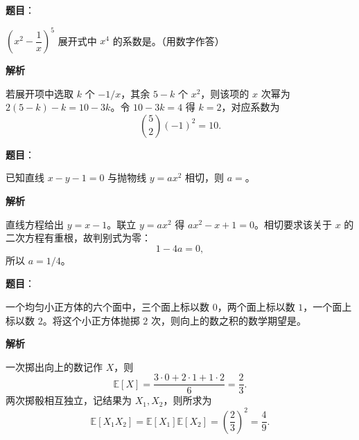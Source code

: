 \begin{answer}

\textbf{题目}：

$\left(x^2-\dfrac{1}{x}\right)^5$ 展开式中 $x^4$ 的系数是\gkblank{}。（用数字作答）

\textbf{解析}

若展开项中选取 $k$ 个 $-1/x$，其余 $5-k$ 个 $x^2$，则该项的 $x$ 次幂为 $2(5-k)-k=10-3k$。令 $10-3k=4$ 得 $k=2$，对应系数为
\nopagebreak[4]
\[
\binom52(-1)^2=10.
\]


\end{answer}
\begin{answer}

\textbf{题目}：

已知直线 $x-y-1=0$ 与抛物线 $y=ax^2$ 相切，则 $a=$\gkblank{}。

\textbf{解析}

直线方程给出 $y=x-1$。联立 $y=ax^2$ 得 $ax^2-x+1=0$。相切要求该关于 $x$ 的二次方程有重根，故判别式为零：
\nopagebreak[4]
\[
1-4a=0,
\]
所以 $a=1/4$。


\end{answer}
\begin{answer}

\textbf{题目}：

一个均匀小正方体的六个面中，三个面上标以数 $0$，两个面上标以数 $1$，一个面上标以数 $2$。将这个小正方体抛掷 $2$ 次，则向上的数之积的数学期望是\gkblank{}。

\textbf{解析}

一次掷出向上的数记作 $X$，则
\nopagebreak[4]
\[
\mathbb E[X]=\frac{3\cdot0+2\cdot1+1\cdot2}{6}=\frac23.
\]
两次掷骰相互独立，记结果为 $X_1,X_2$，则所求为
\nopagebreak[4]
\[
\mathbb E[X_1X_2]=\mathbb E[X_1]\mathbb E[X_2]=\left(\frac23\right)^2=\frac49.
\]


\end{answer}
